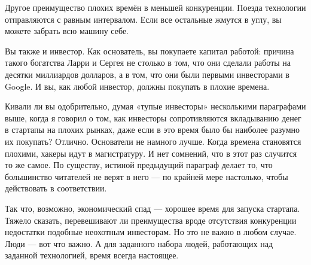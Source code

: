 \documentclass[ebook,12pt,oneside,openany]{memoir}
\begin{document}
Другое преимущество плохих времён в меньшей конкуренции. Поезда
технологии отправляются с равным интервалом. Если все остальные жмутся
в углу, вы можете забрать всю машину себе.

Вы также и инвестор. Как основатель, вы покупаете капитал работой:
причина такого богатства Ларри и Сергея не столько в том, что они
сделали работы на десятки миллиардов долларов, а в том, что они были
первыми инвесторами в Google. И вы, как любой инвестор, должны
покупать в плохие времена.

Кивали ли вы одобрительно, думая «тупые инвесторы» несколькими
параграфами выше, когда я говорил о том, как инвесторы сопротивляются
вкладыванию денег в стартапы на плохих рынках, даже если в это время
было бы наиболее разумно их покупать? Отлично. Основатели не намного
лучше. Когда времена становятся плохими, хакеры идут в магистратуру. И
нет сомнений, что в этот раз случится то же самое. По существу,
истиной предыдущий параграф делает то, что большинство читателей не
верят в него — по крайней мере настолько, чтобы действовать в
соответствии.

Так что, возможно, экономический спад — хорошее время для запуска
стартапа. Тяжело сказать, перевешивают ли преимущества вроде
отсутствия конкуренции недостатки подобные неохотным инвесторам. Но
это не важно в любом случае. Люди — вот что важно. А для заданного
набора людей, работающих над заданной технологией, время всегда
настоящее.
\end{document}
